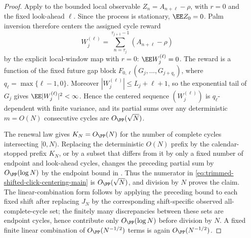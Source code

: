 \begin{proof}
Apply  to the bounded
local observable \(Z_n=A_{n+\ell}-\rho\), with \(r=0\) and the fixed
look-ahead \(\ell\).  Since the process is stationary,
\(\EE Z_0=0\).  Palm inversion therefore centers the assigned cycle reward
\[
W_j^{(\ell)}
=\sum_{n=\tau_j}^{\tau_{j+1}-1}(A_{n+\ell}-\rho)
\]
by the explicit local-window map with \(r=0\):
\(\EE W_j^{(\ell)}=0\).  The reward is a function of the fixed future gap
block \(F_{0,\ell}(G_j,\ldots,G_{j+q_\ell})\), where
\(q_\ell=\max\{\ell-1,0\}\).  Moreover
\(|W_j^{(\ell)}|\le L_j+\ell+1\), so the exponential tail of \(G_j\) gives
\(\EE |W_j^{(\ell)}|^2<\infty\).  Hence the centered sequence
\((W_j^{(\ell)})\) is \(q_\ell\)-dependent with finite variance, and its
partial sums over any deterministic \(m=O(N)\) consecutive cycles are
\(O_{\PP}(\sqrt N)\).

The renewal law gives \(K_N=O_{\PP}(N)\) for the number of complete cycles
intersecting \([0,N)\).  Replacing the deterministic \(O(N)\) prefix by the
calendar-stopped prefix \(K_N\), or by a subset that differs from it by only a
fixed number of endpoint and look-ahead cycles, changes the preceding partial
sum by \(O_{\PP}(\log N)\) by the endpoint bound in
.  Thus the numerator
in \eqref{eq:trimmed-shifted-click-centering-main} is \(O_{\PP}(\sqrt N)\),
and division by \(N\) proves the claim.
The linear-combination form follows by applying the preceding bound to each
fixed shift after replacing \(J_N\) by the corresponding shift-specific
observed all-complete-cycle set; the finitely many discrepancies between these
sets are endpoint cycles, hence contribute only \(O_{\PP}(\log N)\) before
division by \(N\).  A fixed finite linear combination of
\(O_{\PP}(N^{-1/2})\) terms is again \(O_{\PP}(N^{-1/2})\).
\end{proof}



